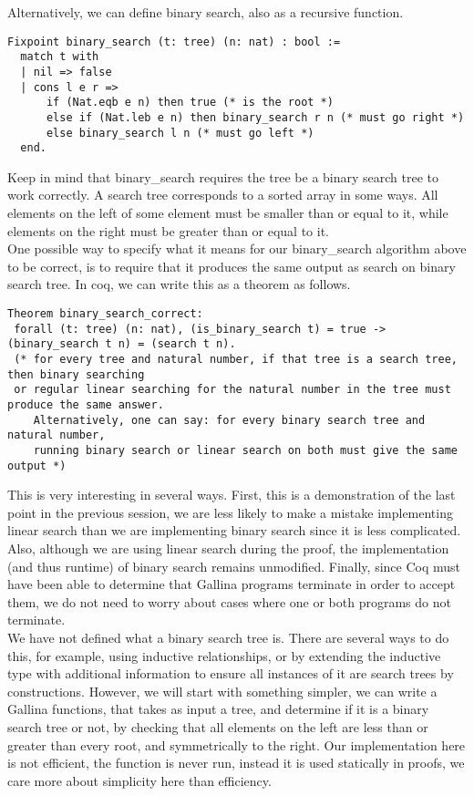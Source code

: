 \documentclass{article}
\begin{document}
Alternatively, we can define binary search, also as a recursive function.
\begin{verbatim}
Fixpoint binary_search (t: tree) (n: nat) : bool :=
  match t with
  | nil => false
  | cons l e r =>
      if (Nat.eqb e n) then true (* is the root *)
      else if (Nat.leb e n) then binary_search r n (* must go right *)
      else binary_search l n (* must go left *)
  end.
\end{verbatim}

Keep in mind that binary\_search requires the tree be a binary search tree
to work correctly. A search tree corresponds to a sorted array in some ways.
All elements on the left of some element must be smaller than or equal to it, 
while elements on the right must be greater than or equal to it. \\

One possible way to specify what it means for our binary\_search algorithm above to
be correct, is to require that it produces the same output as search on binary search tree.
In coq, we can write this as a theorem as follows.
\begin{verbatim}
Theorem binary_search_correct:
 forall (t: tree) (n: nat), (is_binary_search t) = true -> (binary_search t n) = (search t n).
 (* for every tree and natural number, if that tree is a search tree, then binary searching
 or regular linear searching for the natural number in the tree must produce the same answer.
    Alternatively, one can say: for every binary search tree and natural number,
    running binary search or linear search on both must give the same output *)
\end{verbatim}

This is very interesting in several ways. First, this is a demonstration of the last point in the
previous session, we are less likely to make a mistake implementing linear search
than we are implementing binary search since it is less complicated. Also, although we are using
linear search during the proof, the implementation (and thus runtime) of binary search remains
unmodified. Finally, since Coq must have been able to determine that Gallina programs terminate in order
to accept them, we do not need to worry about cases where one or both programs do not terminate. \\

We have not defined what a binary search tree is. There are several ways to do this, for example, using
inductive relationships, or by extending the inductive type with additional information to ensure
all instances of it are search trees by constructions. However, we will start with something simpler, we
can write a Gallina functions, that takes as input a tree, and determine if it is a binary search tree or not,
by checking that all elements on the left are less than or greater than every root, and symmetrically to the right.
Our implementation here is not efficient, the function is never run, instead it is used statically in proofs, we
care more about simplicity here than efficiency. \\
\end{document}
